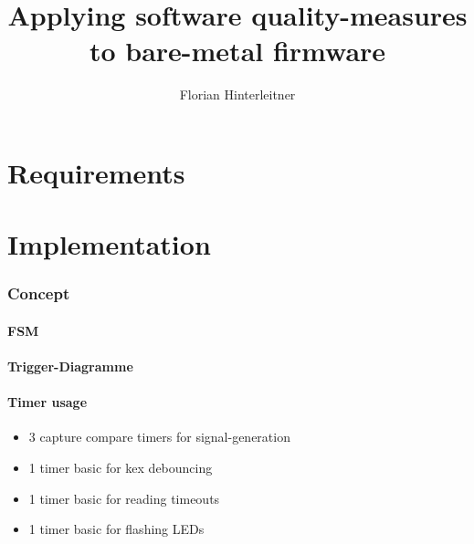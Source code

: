 \documentclass[master,english,smartquotes,apa]{hgbthesis}
\title{ Applying software quality-measures to bare-metal firmware}
\author{Florian Hinterleitner}
\newcommand{\TODO}[1]{\textcolor{red}{\textbf{ToDo:} #1}}
\begin{document}
\frontmatter                                   %
\maketitle

\tableofcontents

		
			

\mainmatter                                    %




% 

	
	\chapter{Requirements}
	\label{cha:Requirements}

	\chapter{Implementation}
	\label{cha:Implementation}
		\subsection{Concept}
		\subsubsection{FSM}
		\subsubsection{Trigger-Diagramme}
		\subsubsection{Timer usage}
			\begin{itemize} \setlength\itemsep{1px}
			\item 3 capture compare timers for signal-generation
			\item 1 timer basic for kex debouncing 
			\item 1 timer basic for reading timeouts
			\item 1 timer basic for flashing LEDs
			\end{itemize}
\end{document}

